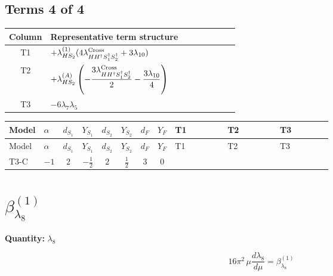 \documentclass[8pt]{article}
\begin{document}
\begin{landscape}
\subsection*{Terms 4 of 4}
\begin{center}
\begin{tabular}{@{}c >{\raggedright\arraybackslash}p{0.82\linewidth}@{}}
\toprule
Column & Representative term structure \\
\midrule
T1 & \(\displaystyle +{\lambda_{HS_2}^{(1)}} (4 {\lambda_{H H^\dagger S_1^\dagger S_2^\dagger}^{\rm Cross}}+3 {\lambda_{10}})\) \\
\midrule
T2 & \(\displaystyle +{\lambda_{HS_2}^{(A)}} \left(-\frac{3 {\lambda_{H H^\dagger S_1^\dagger S_2^\dagger}^{\rm Cross}}}{2}-\frac{3 {\lambda_{10}}}{4}\right)\) \\
\midrule
T3 & \(\displaystyle -6 {\lambda_{7}} {\lambda_5}\) \\
\midrule
\bottomrule
\end{tabular}
\end{center}
\smallskip
\tiny
\begin{longtable}{@{}llcccccc >{\raggedright\arraybackslash}p{0.21\linewidth} >{\raggedright\arraybackslash}p{0.21\linewidth} >{\raggedright\arraybackslash}p{0.21\linewidth}@{}}
\toprule
Model & $\alpha$ & $d_{S_1}$ & $Y_{S_1}$ & $d_{S_2}$ & $Y_{S_2}$ & $d_F$ & $Y_F$ & T1 & T2 & T3 \\
\midrule
\endfirsthead
\toprule
Model & $\alpha$ & $d_{S_1}$ & $Y_{S_1}$ & $d_{S_2}$ & $Y_{S_2}$ & $d_F$ & $Y_F$ & T1 & T2 & T3 \\
\midrule
\endhead
T3-C & $-1$ & $2$ & $-\frac{1}{2}$ & $2$ & $\frac{1}{2}$ & $3$ & $0$ & \scriptsize\adjustbox{max width=\linewidth}{$\begin{gathered} +{\lambda_{HS_2}^{(1)}} (4 {\lambda_{H H^\dagger S_1^\dagger S_2^\dagger}^{\rm Cross}}+3 {\lambda_{10}})\end{gathered}$} & \scriptsize\adjustbox{max width=\linewidth}{$\begin{gathered} +{\lambda_{HS_2}^{(A)}} \left(-\frac{3 {\lambda_{H H^\dagger S_1^\dagger S_2^\dagger}^{\rm Cross}}}{2}-\frac{3 {\lambda_{10}}}{4}\right)\end{gathered}$} & \scriptsize\adjustbox{max width=\linewidth}{$\begin{gathered} -6 {\lambda_{7}} {\lambda_5}\end{gathered}$} \\
\midrule
\bottomrule
\end{longtable}
\clearpage
\section*{$\beta_{\lambda_{8}}^{(1)}$}
\noindent\textbf{Quantity: }$\lambda_{8}$\par\smallskip
\[16\pi^2\,\mu\frac{d \lambda_{8}}{d\mu}=\beta_{\lambda_{8}}^{(1)}\]

\end{landscape}
\end{document}
